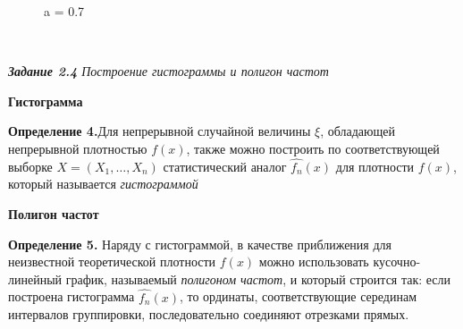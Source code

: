 \documentclass[a4paper,12pt, oneside]{book}
\begin{document}
\begin{figure}[h!]
\begin{center}
		\vfill
		\begin{minipage}[h]{0.47\linewidth}
			 a = 0.7 \\
		\end{minipage}
	\end{center}
\end{figure}

\vspace{5mm}
\\
\vspace{5mm}


\newpage
{\large\textit{\textbf{Задание 2.4} Построение гистограммы и полигон частот}}

\vspace{5mm}
\large{\textbf{Гистограмма}}
\vspace{5mm}

\normalsize{\textbf{Определение 4.}}Для непрерывной случайной величины $\xi$, обладающей непрерывной плотностью $f(x)$, также можно построить по соответствующей выборке $X = (X_1, \ldots, X_n)$ статистический аналог $\hat{f_n} (x)$ для плотности $f(x)$, который называется \textit{гистограммой}  

\vspace{5mm}
\large{\textbf{Полигон частот}}
\vspace{5mm}

\normalsize{\textbf{Определение 5.}} Наряду с гистограммой, в качестве приближения для неизвестной теоретической плотности $ f(x)$ можно использовать кусочно-линейный график, называемый \textit{полигоном частот}, и который строится так: если построена гистограмма $\hat{f_n} (x)$, то ординаты, соответствующие серединам интервалов группировки, последовательно соединяют отрезками прямых. 
\end{document}
